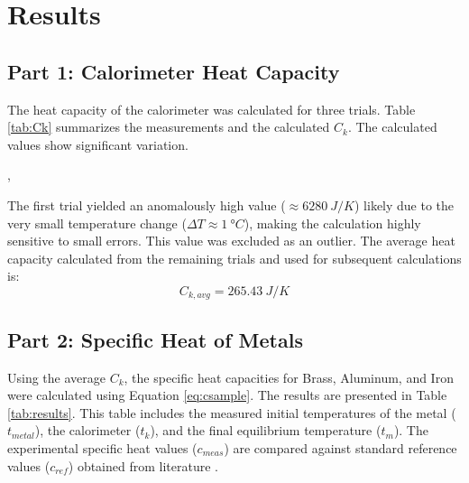 \documentclass[journal]{IEEEtran}
\begin{document}
\section{Results}

\subsection{Part 1: Calorimeter Heat Capacity}
The heat capacity of the calorimeter was calculated for three trials. Table \ref{tab:Ck} summarizes the measurements and the calculated $C_k$. The calculated values show significant variation.

\begin{table}[H]
    \centering
    \caption{Determination of Calorimeter Heat Capacity ($C_k$). Note: $m_w$ is derived from volume assuming $\rho = \SI{1}{g/ml}$.}
    \label{tab:Ck}
\end{table},

The first trial yielded an anomalously high value ($\approx \SI{6280}{J/K}$) likely due to the very small temperature change ($\Delta T \approx \SI{1}{\degree C}$), making the calculation highly sensitive to small errors. This value was excluded as an outlier. The average heat capacity calculated from the remaining trials and used for subsequent calculations is:
\begin{equation*}
    C_{k,avg} = \SI{265.43}{J/K}
\end{equation*}

\subsection{Part 2: Specific Heat of Metals}
Using the average $C_k$, the specific heat capacities for Brass, Aluminum, and Iron were calculated using Equation \eqref{eq:csample}. The results are presented in Table \ref{tab:results}. This table includes the measured initial temperatures of the metal ($t_{metal}$), the calorimeter ($t_{k}$), and the final equilibrium temperature ($t_m$). The experimental specific heat values ($c_{meas}$) are compared against standard reference values ($c_{ref}$) obtained from literature \cite{misumi}.
\end{document}
